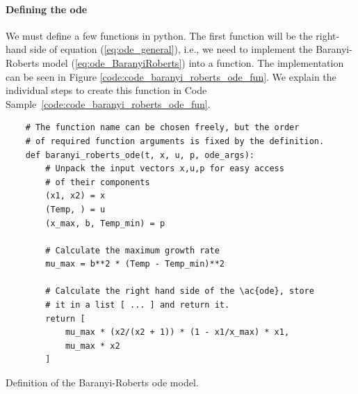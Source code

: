 \documentclass[10pt,A4paper]{article}
\begin{document}
\paragraph{Defining the \acs{ode}}
We must define a few functions in python.
The first function will be the right-hand side of equation (\ref{eq:ode_general}), i.e., we need to implement the Baranyi-Roberts model (\ref{eq:ode_BaranyiRoberts}) into a function.
The implementation can be seen in Figure \ref{code:code_baranyi_roberts_ode_fun}.
We explain the individual steps to create this function in Code Sample~\ref{code:code_baranyi_roberts_ode_fun}.
\begin{code}[h]
    \begin{verbatim}
    # The function name can be chosen freely, but the order
    # of required function arguments is fixed by the definition.
    def baranyi_roberts_ode(t, x, u, p, ode_args):
        # Unpack the input vectors x,u,p for easy access
        # of their components
        (x1, x2) = x
        (Temp, ) = u
        (x_max, b, Temp_min) = p

        # Calculate the maximum growth rate
        mu_max = b**2 * (Temp - Temp_min)**2

        # Calculate the right hand side of the \ac{ode}, store
        # it in a list [ ... ] and return it.
        return [
            mu_max * (x2/(x2 + 1)) * (1 - x1/x_max) * x1,
            mu_max * x2
        ]
    \end{verbatim}
    \caption{
        Definition of the Baranyi-Roberts \ac{ode} model.
    }
    \label{code:code_baranyi_roberts_ode_fun}
\end{code}
%
\end{document}
